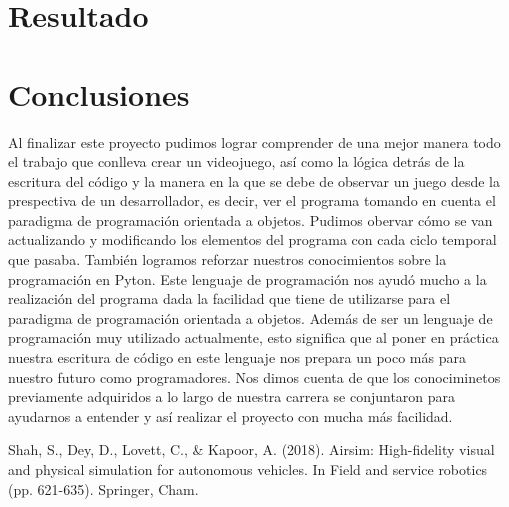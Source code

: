 \documentclass[12pt,letterpaper]{report}
\begin{document}
\chapter{Resultado}




\chapter{Conclusiones}
Al finalizar este proyecto pudimos lograr comprender de una mejor manera todo el trabajo que conlleva crear un videojuego, así como la lógica detrás de la escritura del código y la manera en la que se debe de observar un juego desde la prespectiva de un desarrollador, es decir, ver el programa tomando en cuenta el paradigma de programación orientada a objetos. \newline
Pudimos obervar cómo se van actualizando y modificando los elementos del programa con cada ciclo temporal que pasaba. \newline \newline
También logramos reforzar nuestros conocimientos sobre la programación en Pyton. Este lenguaje de programación nos ayudó mucho a la realización del programa dada la facilidad que tiene de utilizarse para el paradigma de programación orientada a objetos. Además de ser un lenguaje de programación muy utilizado actualmente, esto significa que al poner en práctica nuestra escritura de código en este lenguaje nos prepara un poco más para nuestro futuro como programadores. \newline
Nos dimos cuenta de que los conociminetos previamente adquiridos a lo largo de nuestra carrera se conjuntaron para ayudarnos a entender y así realizar el proyecto con mucha más facilidad.

\begin{thebibliography}{0}

   Shah, S., Dey, D., Lovett, C., \& Kapoor, A. (2018). Airsim: High-fidelity visual and physical simulation for autonomous vehicles. In Field and service robotics (pp. 621-635). Springer, Cham.
  
\end{thebibliography}
\end{document}
